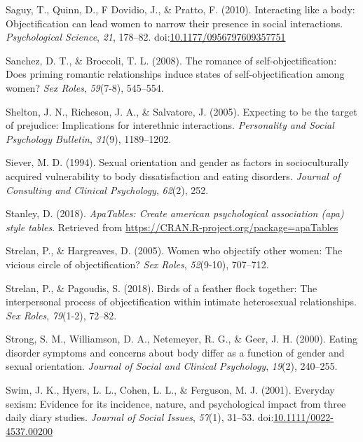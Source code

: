 \documentclass[man]{apa6}
\begin{document}
\hypertarget{ref-saguyetal2010}{}
Saguy, T., Quinn, D., F Dovidio, J., \& Pratto, F. (2010). Interacting
like a body: Objectification can lead women to narrow their presence in
social interactions. \emph{Psychological Science}, \emph{21}, 178--82.
doi:\href{https://doi.org/10.1177/0956797609357751}{10.1177/0956797609357751}

\hypertarget{ref-sanchez2008romance}{}
Sanchez, D. T., \& Broccoli, T. L. (2008). The romance of
self-objectification: Does priming romantic relationships induce states
of self-objectification among women? \emph{Sex Roles}, \emph{59}(7-8),
545--554.

\hypertarget{ref-shelton2005expecting}{}
Shelton, J. N., Richeson, J. A., \& Salvatore, J. (2005). Expecting to
be the target of prejudice: Implications for interethnic interactions.
\emph{Personality and Social Psychology Bulletin}, \emph{31}(9),
1189--1202.

\hypertarget{ref-siever1994sexual}{}
Siever, M. D. (1994). Sexual orientation and gender as factors in
socioculturally acquired vulnerability to body dissatisfaction and
eating disorders. \emph{Journal of Consulting and Clinical Psychology},
\emph{62}(2), 252.

\hypertarget{ref-R-apaTables}{}
Stanley, D. (2018). \emph{ApaTables: Create american psychological
association (apa) style tables}. Retrieved from
\url{https://CRAN.R-project.org/package=apaTables}

\hypertarget{ref-strelan2005women}{}
Strelan, P., \& Hargreaves, D. (2005). Women who objectify other women:
The vicious circle of objectification? \emph{Sex Roles},
\emph{52}(9-10), 707--712.

\hypertarget{ref-strelan2018birds}{}
Strelan, P., \& Pagoudis, S. (2018). Birds of a feather flock together:
The interpersonal process of objectification within intimate
heterosexual relationships. \emph{Sex Roles}, \emph{79}(1-2), 72--82.

\hypertarget{ref-strong2000eating}{}
Strong, S. M., Williamson, D. A., Netemeyer, R. G., \& Geer, J. H.
(2000). Eating disorder symptoms and concerns about body differ as a
function of gender and sexual orientation. \emph{Journal of Social and
Clinical Psychology}, \emph{19}(2), 240--255.

\hypertarget{ref-swimetal}{}
Swim, J. K., Hyers, L. L., Cohen, L. L., \& Ferguson, M. J. (2001).
Everyday sexism: Evidence for its incidence, nature, and psychological
impact from three daily diary studies. \emph{Journal of Social Issues},
\emph{57}(1), 31--53.
doi:\href{https://doi.org/10.1111/0022-4537.00200}{10.1111/0022-4537.00200}
\end{document}
